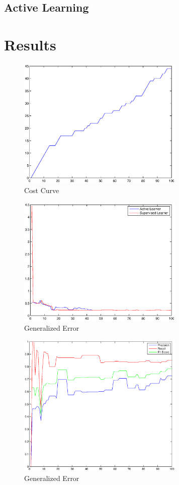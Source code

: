 \documentclass[12pt]{article}
\begin{document}
\subsection{Active Learning}



\section{Results}

\begin{figure}
	\centering
	\includegraphics[width=300px]{costcurve}
	\caption{Cost Curve}
	\label{fig:costcurve}
\end{figure}

\begin{figure}
	\centering
	\includegraphics[width=300px]{generr}
	\caption{Generalized Error}
	\label{fig:generr}
\end{figure}

\begin{figure}
	\centering
	\includegraphics[width=300px]{precisionrecall}
	\caption{Generalized Error}
	\label{fig:precisionrecall}
\end{figure}
\end{document}
